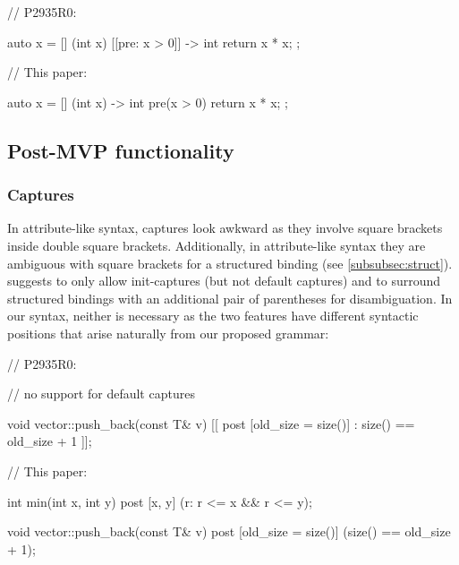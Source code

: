 \begin{minipage}{8cm}
\begin{codeblock}
// P2935R0:

auto x = [] (int x)
  [[pre: x > 0]] -> int
{ 
  return x * x; 
};
\end{codeblock}
\end{minipage}
\begin{minipage}{8cm}
\begin{codeblock}
// This paper:

auto x = [] (int x) -> int 
  pre(x > 0)
{ 
  return x * x; 
};
\end{codeblock}
\end{minipage}

\subsection{Post-MVP functionality}

\subsubsection{Captures}
\label{subsubsec:comp_captures}

In attribute-like syntax, captures look awkward as they involve square brackets inside double square brackets. Additionally, in attribute-like syntax they are ambiguous with square brackets for a structured binding (see \ref{subsubsec:struct}). \cite{P2935R0} suggests to only allow init-captures (but not default captures) and to surround structured bindings with an additional pair of parentheses for disambiguation. In our syntax, neither is necessary as the two features have different syntactic positions that arise naturally from our proposed grammar:

\begin{minipage}[t]{8cm}
\begin{codeblock}
// P2935R0:

// no support for default captures


void vector::push_back(const T& v)
  [[ post [old_size = size()]
    : size() == old_size + 1 ]];
    
\end{codeblock}
\end{minipage}
\begin{minipage}[t]{8cm}
\begin{codeblock}
// This paper:
    
int min(int x, int y)
  post [x, y] (r: r <= x && r <= y);
  
void vector::push_back(const T& v)
  post [old_size = size()] 
    (size() == old_size + 1);
\end{codeblock}
\end{minipage}

